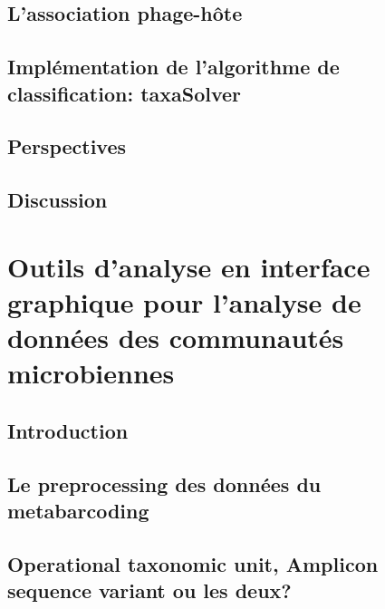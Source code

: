 \documentclass[12pt,twoside]{reedthesis}
\begin{document}
\hypertarget{lassociation-phage-huxf4te}{%
\section{L'association phage-hôte}\label{lassociation-phage-huxf4te}}

\hypertarget{impluxe9mentation-de-lalgorithme-de-classification-taxasolver}{%
\section{Implémentation de l'algorithme de classification: taxaSolver}\label{impluxe9mentation-de-lalgorithme-de-classification-taxasolver}}

\hypertarget{perspectives-1}{%
\section{Perspectives}\label{perspectives-1}}

\hypertarget{discussion-1}{%
\section{Discussion}\label{discussion-1}}

\hypertarget{gui-tool}{%
\chapter{Outils d'analyse en interface graphique pour l'analyse de données des communautés microbiennes}\label{gui-tool}}

\hypertarget{introduction-3}{%
\section{Introduction}\label{introduction-3}}

\hypertarget{le-preprocessing-des-donnuxe9es-du-metabarcoding}{%
\section{Le preprocessing des données du metabarcoding}\label{le-preprocessing-des-donnuxe9es-du-metabarcoding}}

\hypertarget{operational-taxonomic-unit-amplicon-sequence-variant-ou-les-deux}{%
\section{Operational taxonomic unit, Amplicon sequence variant ou les deux?}\label{operational-taxonomic-unit-amplicon-sequence-variant-ou-les-deux}}
\end{document}
